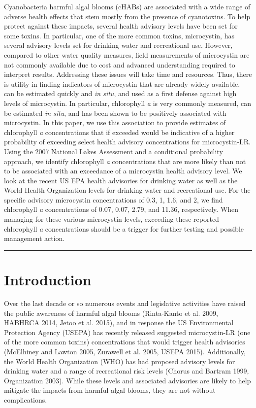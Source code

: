 \documentclass[11pt,]{article}
\begin{document}
Cyanobacteria harmful algal blooms (cHABs) are associated with a wide
range of adverse health effects that stem mostly from the presence of
cyanotoxins. To help protect against these impacts, several health
advisory levels have been set for some toxins. In particular, one of the
more common toxins, microcystin, has several advisory levels set for
drinking water and recreational use. However, compared to other water
quality measures, field measurements of microcystin are not commonly
available due to cost and advanced understanding required to interpret
results. Addressing these issues will take time and resources. Thus,
there is utility in finding indicators of microcystin that are already
widely available, can be estimated quickly and \emph{in situ}, and used
as a first defense against high levels of microcystin. In particular,
chlorophyll \emph{a} is very commonly measured, can be estimated
\emph{in situ}, and has been shown to be positively associated with
microcystin. In this paper, we use this association to provide estimates
of chlorophyll \emph{a} concentrations that if exceeded would be
indicative of a higher probability of exceeding select health advisory
concentrations for microcystin-LR. Using the 2007 National Lakes
Assessment and a conditional probability approach, we identify
chlorophyll \emph{a} concentrations that are more likely than not to be
associated with an exceedance of a microcystin health advisory level. We
look at the recent US EPA health advisories for drinking water as well
as the World Health Organization levels for drinking water and
recreational use. For the specific advisory microcystin concentrations
of 0.3, 1, 1.6, and 2, we find chlorophyll \emph{a} concentrations of
0.07, 0.07, 2.79, and 11.36, respectively. When managing for these
various microcystin levels, exceeding these reported chlorophyll
\emph{a} concentrations should be a trigger for further testing and
possible management action.

\vspace{3mm}

\hrule

\doublespace

\section{Introduction}\label{introduction}

Over the last decade or so numerous events and legislative activities
have raised the public awareness of harmful algal blooms (Rinta-Kanto et
al. 2009, HABHRCA 2014, Jetoo et al. 2015), and in response the US
Environmental Protection Agency (USEPA) has recently released suggested
microcystin-LR (one of the more common toxins) concentrations that would
trigger health advisories (McElhiney and Lawton 2005, Zurawell et al.
2005, USEPA 2015). Additionally, the World Health Organization (WHO) has
had proposed advisory levels for drinking water and a range of
recreational risk levels (Chorus and Bartram 1999, Organization 2003).
While these levels and associated advisories are likely to help mitigate
the impacts from harmful algal blooms, they are not without
complications.
\end{document}

